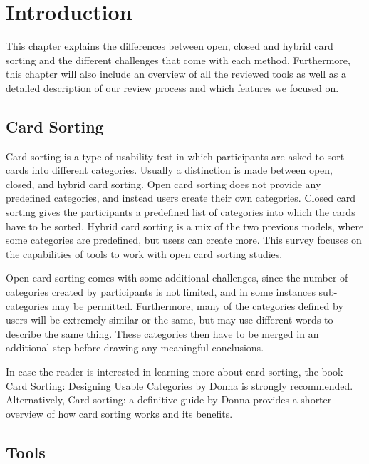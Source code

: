\chapter{Introduction}

\label{chap:Intro}

This chapter explains the differences between open, closed and hybrid card
sorting and the different challenges that come with each method. Furthermore, 
this chapter will also include an overview of all the reviewed tools as well as 
a detailed description of our review process and which features we focused on.


\section{Card Sorting}

Card sorting is a type of usability test in which participants are
asked to sort cards into different categories. Usually a distinction
is made between open, closed, and hybrid card sorting. Open card
sorting does not provide any predefined categories, and instead users
create their own categories. Closed card sorting gives the
participants a predefined list of categories into which the cards have
to be sorted. Hybrid card sorting is a mix of the two previous models,
where some categories are predefined, but users can create more. This
survey focuses on the capabilities of tools to work with open card
sorting studies.

Open card sorting comes with some additional challenges, since the
number of categories created by participants is not limited, and in
some instances sub-categories may be permitted. Furthermore, many of
the categories defined by users will be extremely similar or the same,
but may use different words to describe the same thing. These
categories then have to be merged in an additional step before drawing
any meaningful conclusions.

In case the reader is interested in learning more about card sorting, the book
Card Sorting: Designing Usable Categories by Donna
\textcite{DonnaSpencer1} is strongly recommended. Alternatively, Card sorting: a 
definitive guide by Donna \textcite{DonnaSpencer2} provides a shorter overview of how 
card sorting works and its benefits.


\section{Tools}

